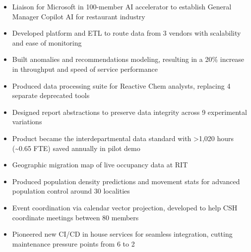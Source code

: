 \documentclass[10pt,a4paper,ragged2e,withhyper]{altacv}
\begin{document}
\begin{paracol}{2}


\begin{itemize}
    \item Liaison for Microsoft in 100-member AI accelerator to establish General Manager Copilot AI for restaurant industry
    \item Developed platform and ETL to route data from 3 vendors with scalability and ease of monitoring
    \item Built anomalies and recommendations modeling, resulting in a 20\% increase in throughput and speed of service performance
\end{itemize}

\divider

\begin{itemize}
    \item Produced data processing suite for Reactive Chem analysts, replacing 4 separate deprecated tools
    \item Designed report abstractions to preserve data integrity across 9 experimental variations
    \item Product became the interdepartmental data standard with >1,020 hours (\textasciitilde 0.65 FTE) saved annually in pilot demo
\end{itemize}


\begin{itemize}    
    \item Geographic migration map of live occupancy data at RIT
    \item Produced population density predictions and movement stats for advanced population control around 30 localities
\end{itemize}

\divider

\begin{itemize}
    \item Event coordination via calendar vector projection, developed to help CSH coordinate meetings between 80 members
    \item Pioneered new CI/CD in house services for seamless integration, cutting maintenance pressure points from 6 to 2
\end{itemize}



\end{paracol}
\end{document}
